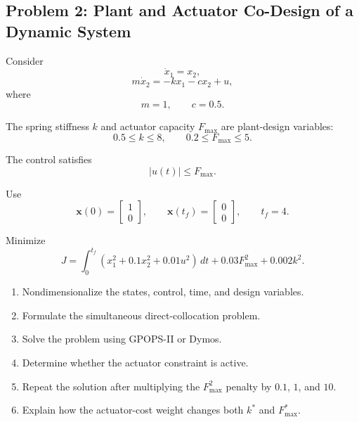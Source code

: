 \subsection*{Problem 2: Plant and Actuator Co-Design of a Dynamic System}

Consider
\begin{equation}
\dot{x}_1=x_2,
\end{equation}
\begin{equation}
m\dot{x}_2=-kx_1-cx_2+u,
\end{equation}
where
\begin{equation}
m=1,
\qquad
c=0.5.
\end{equation}

The spring stiffness $k$ and actuator capacity $F_{\max}$ are plant-design
variables:
\begin{equation}
0.5 \leq k \leq 8,
\qquad
0.2 \leq F_{\max} \leq 5.
\end{equation}

The control satisfies
\begin{equation}
|u(t)| \leq F_{\max}.
\end{equation}

Use
\begin{equation}
\mathbf{x}(0)=
\begin{bmatrix}
1\\
0
\end{bmatrix},
\qquad
\mathbf{x}(t_f)=
\begin{bmatrix}
0\\
0
\end{bmatrix},
\qquad
t_f=4.
\end{equation}

Minimize
\begin{equation}
J=
\int_0^{t_f}
\left(
x_1^2+0.1x_2^2+0.01u^2
\right)\,dt
+
0.03F_{\max}^2
+
0.002k^2.
\end{equation}

\begin{enumerate}
    \item Nondimensionalize the states, control, time, and design variables.
    
    \item Formulate the simultaneous direct-collocation problem.
    
    \item Solve the problem using GPOPS-II or Dymos.
    
    \item Determine whether the actuator constraint is active.
    
    \item Repeat the solution after multiplying the $F_{\max}^2$ penalty by
    $0.1$, $1$, and $10$.
    
    \item Explain how the actuator-cost weight changes both $k^*$ and
    $F_{\max}^*$.
\end{enumerate}


